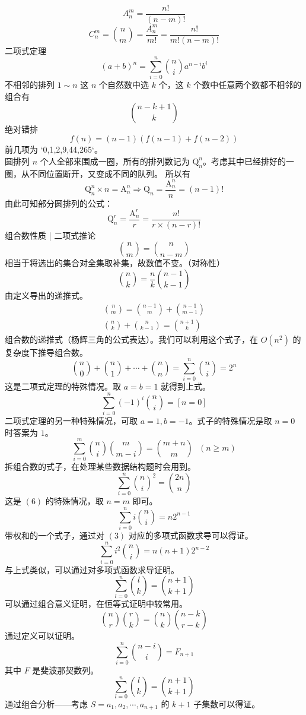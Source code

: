 $$
A_n^m = \dfrac{n!}{(n - m)!}
$$
$$
C_n^m =\binom{n}{m}  = \dfrac{A_n^m}{m!} = \dfrac{n!}{m!(n - m)!}
$$
二项式定理
$$
(a + b)^n = \sum_{i=0}^{n}\binom{n}{i} a^{n - i}b^i
$$
不相邻的排列
$1 \sim n$ 这 $n$ 个自然数中选 $k$ 个，这 $k$ 个数中任意两个数都不相邻的组合有 
$$
\binom{n-k+1}{k}
$$
绝对错排
$$
f(n) = (n - 1)(f(n - 1) + f(n - 2))
$$
前几项为 `0,1,2,9,44,265`。\\
圆排列
$n$ 个人全部来围成一圈，所有的排列数记为 $\mathrm Q_n^n$。考虑其中已经排好的一圈，从不同位置断开，又变成不同的队列。 所以有
$$
\mathrm Q_n^n \times n = \mathrm A_n^n \Longrightarrow \mathrm Q_n = \frac{\mathrm A_n^n}{n} = (n-1)!
$$
由此可知部分圆排列的公式：
$$
\mathrm Q_n^r = \frac{\mathrm A_n^r}{r} = \frac{n!}{r \times (n-r)!}
$$
组合数性质 | 二项式推论
$$
\binom{n}{m}=\binom{n}{n-m}
$$
相当于将选出的集合对全集取补集，故数值不变。（对称性）
$$
\binom{n}{k} = \frac{n}{k} \binom{n-1}{k-1}
$$
由定义导出的递推式。
$$
\begin{aligned}
\binom{n}{m}=\binom{n-1}{m}+\binom{n-1}{m-1} \\
\binom{n}{k} + \binom{n}{k - 1} = \binom{n + 1}{k}
\end{aligned}
$$
组合数的递推式（杨辉三角的公式表达）。我们可以利用这个式子，在 $O(n^2)$ 的复杂度下推导组合数。
$$
\binom{n}{0}+\binom{n}{1}+\cdots+\binom{n}{n}=\sum_{i=0}^n\binom{n}{i}=2^n
$$
这是二项式定理的特殊情况。取 $a=b=1$ 就得到上式。
$$
\sum_{i=0}^n(-1)^i\binom{n}{i}=[n=0]
$$
二项式定理的另一种特殊情况，可取 $a=1, b=-1$。式子的特殊情况是取 $n=0$ 时答案为 $1$。
$$
\sum_{i=0}^m \binom{n}{i}\binom{m}{m-i} = \binom{m+n}{m}\ \ \ (n \geq m)
$$
拆组合数的式子，在处理某些数据结构题时会用到。
$$
\sum_{i=0}^n\binom{n}{i}^2=\binom{2n}{n}
$$
这是 $(6)$ 的特殊情况，取 $n=m$ 即可。
$$
\sum_{i=0}^ni\binom{n}{i}=n2^{n-1}
$$
带权和的一个式子，通过对 $(3)$ 对应的多项式函数求导可以得证。
$$
\sum_{i=0}^ni^2\binom{n}{i}=n(n+1)2^{n-2}
$$
与上式类似，可以通过对多项式函数求导证明。
$$
\sum_{l=0}^n\binom{l}{k} = \binom{n+1}{k+1}
$$
可以通过组合意义证明，在恒等式证明中较常用。
$$
\binom{n}{r}\binom{r}{k} = \binom{n}{k}\binom{n-k}{r-k}
$$
通过定义可以证明。
$$
\sum_{i=0}^n\binom{n-i}{i}=F_{n+1}
$$
其中 $F$ 是斐波那契数列。
$$
\sum_{l=0}^n \binom{l}{k} = \binom{n+1}{k+1}
$$
通过组合分析——考虑 $S={a_1, a_2, \cdots, a_{n+1}}$ 的 $k+1$ 子集数可以得证。